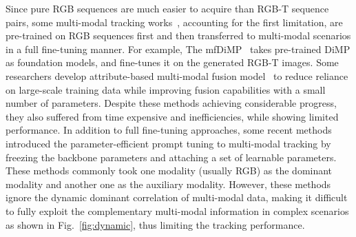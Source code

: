 \documentclass[letterpaper]{article} %
\begin{document}
Since pure RGB sequences are much easier to acquire than RGB-T sequence pairs, some multi-modal tracking works~\cite{DAPNet,DAFNet}, accounting for the first limitation, are pre-trained on RGB sequences first and then transferred to multi-modal scenarios in a full fine-tuning manner. For example, The mfDiMP~\cite{mfDimp} takes pre-trained DiMP as foundation models, and fine-tunes it on the generated RGB-T images. Some researchers develop attribute-based multi-modal fusion model~\cite{CAT,ADRNet,APFNet} to reduce reliance on large-scale training data while improving fusion capabilities with a small number of parameters. Despite these methods achieving considerable progress, they also suffered from time expensive and inefficiencies, while showing limited performance. 
In addition to full fine-tuning approaches, 
some recent methods~\cite{ProTrack,zhu2023visual} introduced the parameter-efficient prompt tuning to multi-modal tracking by freezing the backbone parameters and attaching a set of learnable parameters. These methods commonly took one modality (usually RGB) as the dominant modality and another one as the auxiliary modality. However, these methods ignore the dynamic dominant correlation of multi-modal data, making it difficult to fully exploit the complementary multi-modal information in complex scenarios as shown in Fig.~\ref{fig:dynamic}, thus limiting the tracking performance.
\end{document}
